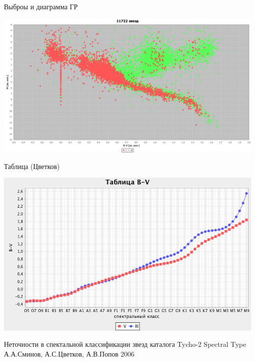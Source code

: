 \documentclass[14pt, fleqn, xcolor={dvipsnames, table}]{beamer}
\begin{document}
		\begin{frame}{Выброы и диаграмма ГР}
            \begin{center}
                \includegraphics[scale=0.23]{outlier-hr.png}
            \end{center}             
        \end{frame}         
        
        \begin{frame}{Таблица (Цветков)}
            \begin{center}
                \includegraphics[scale=0.45]{table-tsvetkov.png}
            \end{center} 
            \tiny{Неточности в спектальной классификации звезд каталога Tycho-2 Spectral Type
А.А.Сминов, А.С.Цветков, А.В.Попов
2006}
        \end{frame} 
        
\end{document}
